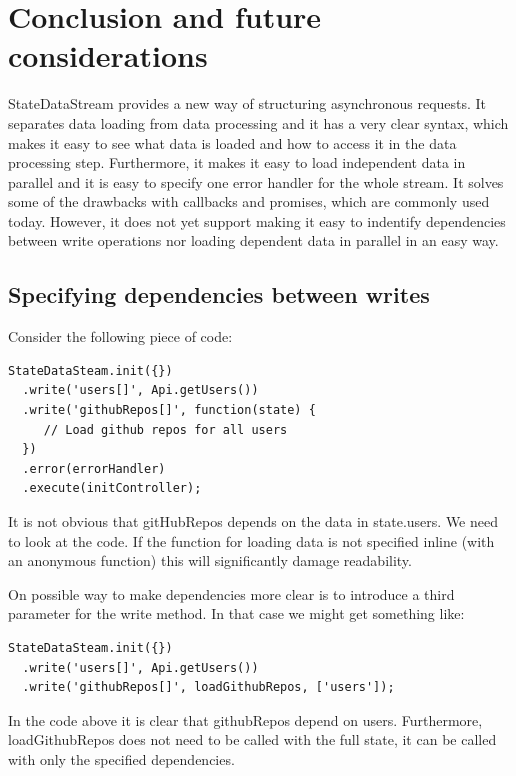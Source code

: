 \documentclass[a4paper,12pt]{article}
\begin{document}
\section{Conclusion and future considerations}
\label{sec:future}
StateDataStream provides a new way of structuring asynchronous requests. It separates data loading from data processing and it has a very clear syntax, which makes it easy to see 
what data is loaded and how to access it in the data processing step. Furthermore, it makes it easy to load independent data in parallel and it is easy to specify one 
error handler for the whole stream. It solves some of the drawbacks with callbacks and promises, which are commonly used today. However, it does not yet support making it easy to indentify dependencies between write operations nor loading dependent data in parallel
in an easy way.

\subsection{Specifying dependencies between writes}
\label{sec:spec_dependencies}
Consider the following piece of code:

\begin{lstlisting}[caption=Executing the stream, frame=single]
StateDataSteam.init({})
  .write('users[]', Api.getUsers())
  .write('githubRepos[]', function(state) {
     // Load github repos for all users
  })
  .error(errorHandler)
  .execute(initController);
\end{lstlisting}
It is not obvious that gitHubRepos depends on the data in state.users. We need to look at the code. If the function for loading data is not specified inline (with an anonymous function) this will significantly damage readability.

On possible way to make dependencies more clear is to introduce a third parameter for the write method. In that case we might get something like:

\begin{lstlisting}[caption=Executing the stream, frame=single]
StateDataSteam.init({})
  .write('users[]', Api.getUsers())
  .write('githubRepos[]', loadGithubRepos, ['users']);
\end{lstlisting}
In the code above it is clear that githubRepos depend on users. Furthermore, loadGithubRepos does not need to be called with the full
state, it can be called with only the specified dependencies.

\clearpage
\end{document}
